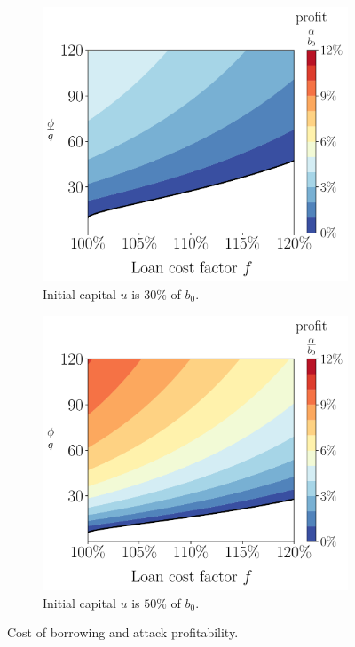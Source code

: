 \begin{figure}[htb]
  \centering
  \begin{subfigure}{0.49\textwidth}
    \includegraphics[width=\textwidth]{./figures/plotf30.pdf}
    \caption{Initial capital $u$ is $30\%$ of $b_0$.}
    \label{fig:plotf30}
  \end{subfigure}
  \hfill
  \begin{subfigure}{0.49\textwidth}
    \includegraphics[width=\textwidth]{./figures/plotf50.pdf}
    \caption{Initial capital $u$ is $50\%$ of $b_0$.}
    \label{fig:plotf50}
  \end{subfigure}
  \caption{Cost of borrowing and attack profitability.}
  \label{fig:plotf}
\end{figure}

